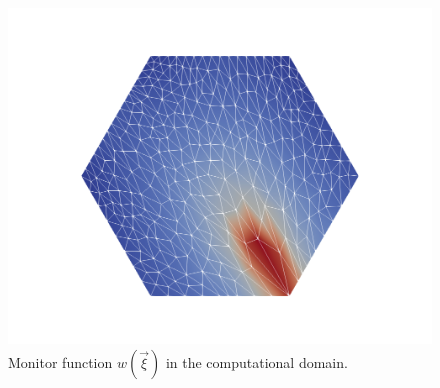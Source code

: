 \documentclass[a4paper,11pt]{article}
\begin{document}
\begin{figure}[h!]
    \centering
    \includegraphics[scale=0.2]{Images/Test1/r-adaptive/w_c.png}
    \caption{Monitor function $w(\vec{\xi})$ in the computational domain.}
    \label{fig:monitor_comp}
  \end{figure}




\end{document}
